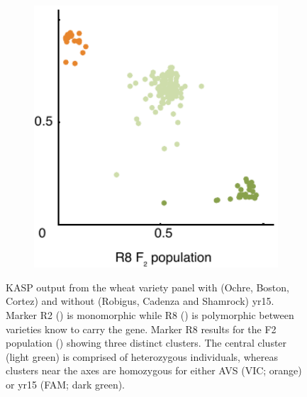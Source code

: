 \begin{figure}[b!]
\begin{subfigure}{0.31\textwidth}
\end{subfigure}
~
\begin{subfigure}{0.31\textwidth}
\caption{}
\label{fig:yr15:r8f2}
\includegraphics[width=1\textwidth]{Yr15/Figures/selection/R8f2.pdf}
\end{subfigure}

\caption[KASP output from the wheat variety panel]{KASP output from the wheat variety panel with (Ochre, Boston, Cortez) and without (Robigus, Cadenza and Shamrock) \acrshort{yr15}. Marker  R2 () is monomorphic while R8 ()  is polymorphic between varieties know to carry the gene.  Marker R8 results for the F2 population () showing three distinct clusters. The central cluster (light green) is comprised of heterozygous individuals, whereas clusters near the axes are homozygous for either AVS (VIC; orange) or \acrshort{yr15} (FAM; dark green).}
\end{figure}


